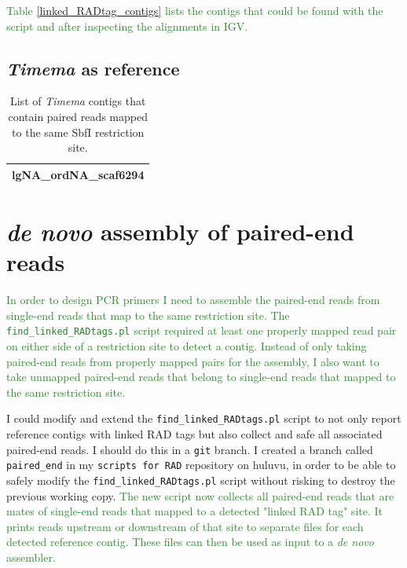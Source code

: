 \documentclass{article}\usepackage[]{graphicx}\usepackage[]{color}
\newcommand{\roger}[1]{ \textcolor[named]{ForestGreen}{#1} }
\begin{document}
\roger{Table \ref{linked_RADtag_contigs} lists the contigs that could be found with the script and after inspecting the alignments in IGV.}

\subsection{\textit{Timema} as reference}

\begin{table}[h!]
\centering
\caption{List of \textit{Timema} contigs that contain paired reads mapped to the same SbfI restriction site.}
\begin{tabular}{l}
\toprule
lgNA\_ordNA\_scaf6294 \\
\bottomrule
\end{tabular}
\label{linked_RADtag_contigs_Timema}
\end{table}

\section{\textit{de novo} assembly of paired-end reads}
\roger{In order to design PCR primers I need to assemble the paired-end reads from single-end reads that map to the same restriction site. The \texttt{find\_linked\_RADtags.pl} script required at least one properly mapped read pair on either side of a restriction site to detect a contig. Instead of only taking paired-end reads from properly mapped pairs for the assembly, I also want to take unmapped paired-end reads that belong to single-end reads that mapped to the same restriction site.}

I could modify and extend the \texttt{find\_linked\_RADtags.pl} script to not only report reference contigs with linked RAD tags but also collect and safe all associated paired-end reads. I should do this in a \texttt{git} branch. I created a branch called \texttt{paired\_end} in my \texttt{scripts for RAD} repository on huluvu, in order to be able to safely modify the \texttt{find\_linked\_RADtags.pl} script without risking to destroy the previous working copy. \roger{The new script now collects all paired-end reads that are mates of single-end reads that mapped to a detected "linked RAD tag" site. It prints reads upstream or downstream of that site to separate files for each detected reference contig. These files can then be used as input to a \textit{de novo} assembler.}
\end{document}

